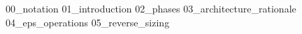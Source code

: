 {00_notation}
\pagebreak
{}
{01_introduction}
{02_phases}
{03_architecture_rationale}
{04_eps_operations}
{05_reverse_sizing}